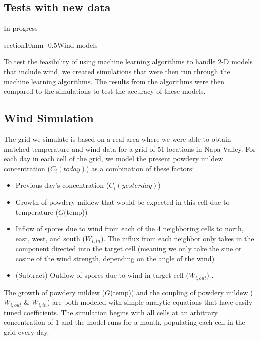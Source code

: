 \documentclass[letterpaper,12pt]{article}
\makeatletter
\renewcommand{\section}{\@startsection%
{section}{1}{0mm}{-\baselineskip}%
{0.5\baselineskip}{\normalfont\Large\bfseries}}%
\makeatother
\begin{document}
\subsection{Tests with new data}

In progress

\section{Wind models} \label{sec:wind_mod}

To test the feasibility of using machine learning algorithms to handle 2-D models that include wind, we created simulations that were then run through the machine learning algorithms. The results from the algorithms were then compared to the simulations to test the accuracy of these models. 

\subsection{Wind Simulation}

The grid we simulate is based on a real area where we were able to obtain matched temperature and wind data for a grid of 51 locations in Napa Valley. For each day in each cell of the grid, we model the present powdery mildew concentration ($C_{i}(today)$) as a combination of these factors:

\begin{itemize}
\item Previous day's concentration ($C_{i}(yesterday)$)
\item Growth of powdery mildew that would be expected in this cell due to temperature ($G$(temp))
\item Inflow of spores due to wind from each of the 4 neighboring cells to north, east, west, and south ($W_{i, in}$).  The influx from each neighbor only takes in the component directed into the target cell (meaning we only take the sine or cosine of the wind strength, depending on the angle of the wind)
\item (Subtract) Outflow of spores due to wind in target cell ($W_{i, out}$) . 
\end{itemize} 

The growth of powdery mildew ($G$(temp)) and the coupling of powdery mildew ($W_{i, out}$ \& $W_{i, in}$) are both modeled with simple analytic equations that have easily tuned coefficients.  The simulation begins with all cells at an arbitrary concentration of 1 and the model runs for a month, populating each cell in the grid every day. 
\end{document}
